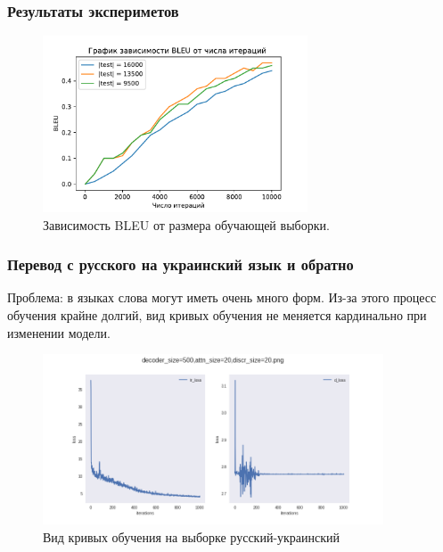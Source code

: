 \documentclass[10pt,pdf,hyperref={unicode}]{beamer}
\begin{document}
\begin{frame}
	\frametitle{Результаты экспериметов}
	
	\begin{figure}[h]
		\centering
		\includegraphics[width=0.7\textwidth]{volume}
		\caption{Зависимость BLEU от размера обучающей выборки.}
	\end{figure}
	
\end{frame}

\begin{frame}
\frametitle{Перевод с русского на украинский язык и обратно} 
\begin{center}
	Проблема: в языках слова могут иметь очень много форм. Из-за этого процесс обучения крайне долгий, вид кривых обучения не меняется кардинально при изменении модели.
	
	\begin{figure}[h]
		\centering
		\includegraphics[width=0.9\textwidth]{decoder_size=500,attn_size=20,discr_size=20}
		\caption{Вид кривых обучения на выборке русский-украинский}
	\end{figure}
	
\end{center}
\end{frame}
\end{document}
